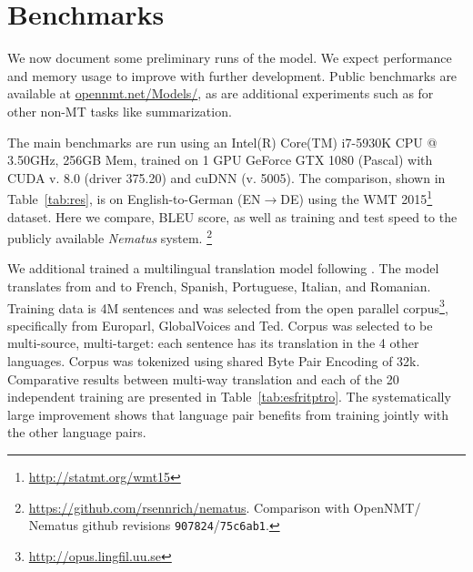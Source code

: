 \documentclass[11pt]{article}
\begin{document}
\section{Benchmarks}

We now document some preliminary runs of the model. We expect
performance and memory usage to improve with further development.
Public benchmarks are available at
\url{opennmt.net/Models/}, as are additional experiments such as for other
non-MT tasks like summarization.


The main benchmarks are run using an Intel(R) Core(TM) i7-5930K CPU @
3.50GHz, 256GB Mem, trained on 1 GPU GeForce GTX 1080 (Pascal) with
CUDA v. 8.0 (driver 375.20) and cuDNN (v. 5005). The comparison, shown
in Table~\ref{tab:res}, is on English-to-German (EN$\rightarrow$DE)
using the WMT 2015\footnote{\url{http://statmt.org/wmt15}}
dataset. Here we compare, BLEU score, as well as training and test
speed to the publicly available \textit{Nematus} system.
\footnote{\url{https://github.com/rsennrich/nematus}. Comparison with
  OpenNMT/ Nematus github revisions {\tt 907824}/{\tt 75c6ab1}.}


We additional trained a multilingual translation model following
. The model translates from and to French,
Spanish, Portuguese, Italian, and Romanian. Training data is 4M
sentences and was selected from the open parallel
corpus\footnote{\url{http://opus.lingfil.uu.se}}, specifically from
Europarl, GlobalVoices and Ted. Corpus was selected to be
multi-source, multi-target: each sentence has its translation in the 4
other languages. Corpus was tokenized using shared Byte
Pair Encoding of 32k.  Comparative results between multi-way
translation and each of the 20 independent training are presented in
Table~\ref{tab:esfritptro}. The systematically large improvement shows
that language pair benefits from training jointly with the  other language pairs.








\end{document}
